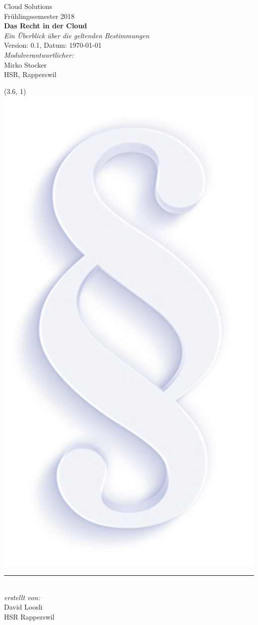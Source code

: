 \documentclass[a4paper,pointlessnumbers]{scrreprt}
\newcommand{\versionsnummer}{0.1}
\begin{document}
\begin{titlepage}
\centering
\vspace*{10mm}
\Large Cloud Solutions\\
\large Frühlingssemester 2018\\
\vspace*{30mm}
\Huge \textbf{Das Recht in der Cloud}\\
\Large \textit{Ein Überblick über die geltenden Bestimmungen}\\
\vspace*{2mm}
\large Version: \versionsnummer, Datum: \today\\
\vspace*{10mm}
\large {\itshape  Modulverantwortlicher:}\\
\large Mirko Stocker\\
\large HSR, Rapperswil\\[\baselineskip]
\begin{textblock}{4}(3.6, 1)
\includegraphics[width=0.5\linewidth]{juscloud}
\end{textblock}
\vfill
{\color{greycolor}\rule{0.5\textwidth}{0.4pt}}\\
\small \textit{erstellt von:}\\
\small David Loosli\\
\small HSR Rapperswil\\
\end{titlepage}
\end{document}
